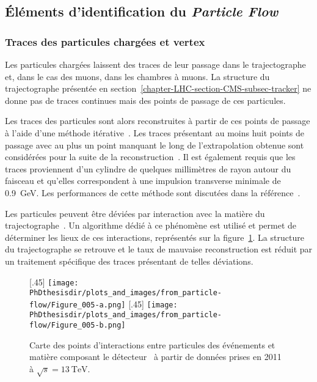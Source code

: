 \subsection{Éléments d'identification du \emph{Particle Flow}}\label{chapter-LHC-section-evt_reco-subsec-PF_elements}
\subsubsection{Traces des particules chargées et vertex}
Les particules chargées laissent des traces de leur passage dans le trajectographe et, dans le cas des muons, dans les chambres à muons.
La structure du trajectographe présentée en section~\ref{chapter-LHC-section-CMS-subsec-tracker} ne donne pas de traces continues mais des points de passage de ces particules.
\par Les traces des particules sont alors reconstruites à partir de ces points de passage à l'aide d'une méthode itérative~\cite{track_reco}.
Les traces présentant au moins huit points de passage avec au plus un point manquant le long de l'extrapolation obtenue sont considérées pour la suite de la reconstruction~\cite{particle-flow}.
Il est également requis que les traces proviennent d'un cylindre de quelques millimètres de rayon autour du faisceau et qu'elles correspondent à une impulsion transverse minimale de \SI{0.9}{\GeV}.
Les performances de cette méthode sont discutées dans la référence~\cite{CMS_TDR_1}.
\par Les particules peuvent être déviées par interaction avec la matière du trajectographe~\cite{moliere_scat_1,moliere_scat_2}.
Un algorithme dédié à ce phénomène est utilisé et permet de déterminer les lieux de ces interactions, représentés sur la figure~\ref{fig-chapter-LHC-section-evt_reco-subsec-PF_elements-CMS-self-radio}.
La structure du trajectographe se retrouve et le taux de mauvaise reconstruction est réduit par un traitement spécifique des traces présentant de telles déviations.
\begin{figure}[h]
\centering
{}[.45\textwidth]
{\texttt{[image: \\PhDthesisdir/plots\_and\_images/from\_particle-flow/Figure\_005-a.png]}}
\hfill
{}[.45\textwidth]
{\texttt{[image: \\PhDthesisdir/plots\_and\_images/from\_particle-flow/Figure\_005-b.png]}}
\caption[Points d'interactions entre particules des événements et matière composant le détecteur.]{Carte des points d'interactions entre particules des événements et matière composant le détecteur~\cite{particle-flow} à partir de données prises en 2011 à $\sqrt{s}=\SI{13}{\TeV}$.}
\label{fig-chapter-LHC-section-evt_reco-subsec-PF_elements-CMS-self-radio}
\end{figure}
